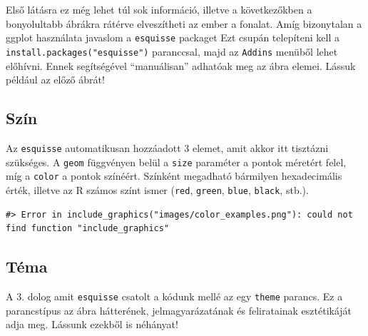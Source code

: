\documentclass[
]{article}
\begin{document}
Első látásra ez még lehet túl sok információ, illetve a következőkben a bonyolultabb ábrákra rátérve elveszítheti az ember a fonalat. Amíg bizonytalan a ggplot használata javaslom a \texttt{esquisse} packaget Ezt csupán telepíteni kell a \texttt{install.packages("esquisse")} paranccsal, majd az \texttt{Addins} menüből lehet előhívni. Ennek segítségével ``manuálisan'' adhatóak meg az ábra elemei. Lássuk például az előző ábrát!

\hypertarget{szuxedn}{%
\subsection{Szín}\label{szuxedn}}

Az \texttt{esquisse} automatikusan hozzáadott 3 elemet, amit akkor itt tisztázni szükséges. A \texttt{geom} függvényen belül a \texttt{size} paraméter a pontok méretért felel, míg a \texttt{color} a pontok színéért. Színként megadható bármilyen hexadecimális érték, illetve az R számos színt ismer (\texttt{red}, \texttt{green}, \texttt{blue}, \texttt{black}, stb.).

\begin{verbatim}
#> Error in include_graphics("images/color_examples.png"): could not find function "include_graphics"
\end{verbatim}

\hypertarget{tuxe9ma}{%
\subsection{Téma}\label{tuxe9ma}}

A 3. dolog amit \texttt{esquisse} csatolt a kódunk mellé az egy \texttt{theme} parancs. Ez a parancstípus az ábra hátterének, jelmagyarázatának és feliratainak esztétikáját adja meg. Lássunk ezekből is néhányat!
\end{document}

